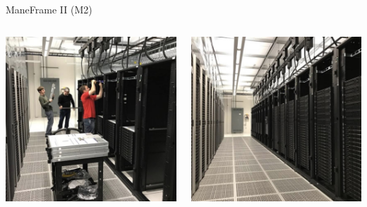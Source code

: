 \begin{frame}{ManeFrame II (M2)}
\begin{columns}
\begin{column}{0.5\textwidth}
\begin{center}
\includegraphics[width=\textwidth]{figures/m2_1.jpg}
\end{center}
\end{column}
\begin{column}{0.5\textwidth}
\begin{center}
\includegraphics[width=\textwidth]{figures/m2_2.jpg}
\end{center}
\end{column}
\end{columns}
\end{frame}

